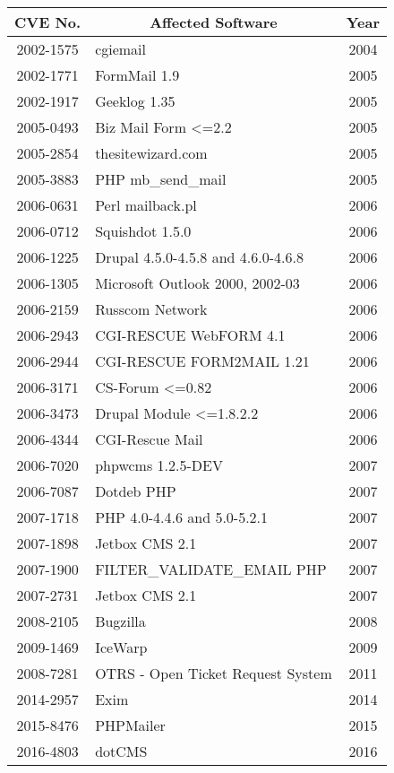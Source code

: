 \begin{table}[tb]
  \scriptsize
  
	\begin{tabular}{|c|p{4.7cm}|c|}
		\hline
		\multicolumn{1}{|c|}{\textbf{CVE No.}} & 
		\multicolumn{1}{c|}{\textbf{Affected Software}} &
		\multicolumn{1}{c|}{\textbf{Year}}\\
		\hline
		{2002-1575} & {cgiemail} & {2004}\\
		\hline
		{2002-1771} & {FormMail 1.9} & {2005}\\
		\hline
		{2002-1917} & {Geeklog 1.35} & {2005}\\
		\hline
		{2005-0493} & {Biz Mail Form <=2.2} & {2005}\\
		\hline
		{2005-2854} & {thesitewizard.com} & {2005}\\
		\hline
		{2005-3883} & {PHP mb\_send\_mail} & {2005}\\
		\hline
		{2006-0631} & {Perl mailback.pl} & {2006}\\
		\hline
		{2006-0712} & {Squishdot 1.5.0} & {2006}\\
		\hline
		{2006-1225} & {Drupal 4.5.0-4.5.8 and 4.6.0-4.6.8} & {2006}\\
		\hline
		{2006-1305} & {Microsoft Outlook 2000, 2002-03} & {2006}\\
		\hline
		{2006-2159} & {Russcom Network} & {2006}\\
		\hline
		{2006-2943} & {CGI-RESCUE WebFORM 4.1} & {2006}\\
		\hline
		{2006-2944} & {CGI-RESCUE FORM2MAIL 1.21} & {2006}\\
		\hline
		{2006-3171} & {CS-Forum <=0.82} & {2006}\\
		\hline
		{2006-3473} & {Drupal Module <=1.8.2.2} & {2006}\\
		\hline
		{2006-4344} & {CGI-Rescue Mail} & {2006}\\
		\hline
		{2006-7020} & {phpwcms 1.2.5-DEV} & {2007}\\
		\hline
		{2006-7087} & {Dotdeb PHP} & {2007}\\
		\hline
		{2007-1718} & {PHP 4.0-4.4.6 and 5.0-5.2.1} & {2007}\\
		\hline
		{2007-1898} & {Jetbox CMS 2.1} & {2007}\\
		\hline
		{2007-1900} & {FILTER\_VALIDATE\_EMAIL PHP} & {2007}\\
		\hline
		{2007-2731} & {Jetbox CMS 2.1} & {2007}\\
		\hline
		{2008-2105} & {Bugzilla} & {2008}\\
		\hline
		{2009-1469} & {IceWarp} & {2009}\\
		\hline
		{2008-7281} & {OTRS - Open Ticket Request System} & {2011}\\
		\hline
		{2014-2957} & {Exim} & {2014}\\
		\hline
		{2015-8476} & {PHPMailer} & {2015}\\
		\hline
		{2016-4803} & {dotCMS} & {2016}\\
		\hline


\end{tabular}
\end{table}

